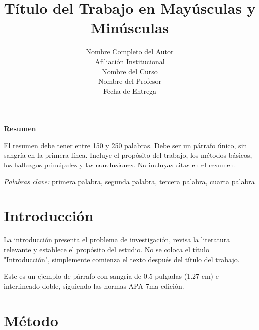 \documentclass[12pt, letterpaper]{article}
\title{
    \vspace{2cm}
    Título del Trabajo en Mayúsculas y Minúsculas \\
    \vspace{1cm}
}
\author{
    Nombre Completo del Autor \\
    \small Afiliación Institucional \\
    \small Nombre del Curso \\
    \small Nombre del Profesor \\
    \small Fecha de Entrega
}
\date{}  %
\begin{document}
\maketitle
\thispagestyle{empty}
\newpage

\setcounter{page}{2}
\begin{center}
    \textbf{Resumen}
\end{center}

\noindent
El resumen debe tener entre 150 y 250 palabras. Debe ser un párrafo único, sin sangría en la primera línea. Incluye el propósito del trabajo, los métodos básicos, los hallazgos principales y las conclusiones. No incluyas citas en el resumen.

\vspace{0.5cm}
\noindent
\textit{Palabras clave:} primera palabra, segunda palabra, tercera palabra, cuarta palabra

\newpage

\tableofcontents
\newpage


\section{Introducción}

La introducción presenta el problema de investigación, revisa la literatura relevante y establece el propósito del estudio. No se coloca el título "Introducción", simplemente comienza el texto después del título del trabajo.

Este es un ejemplo de párrafo con sangría de 0.5 pulgadas (1.27 cm) e interlineado doble, siguiendo las normas APA 7ma edición.

\section{Método}
\end{document}
